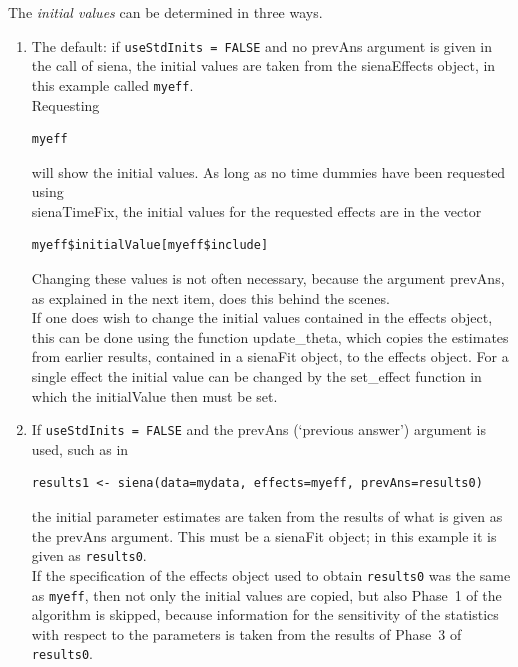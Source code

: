 \documentclass[a4paper,fleqn,11pt]{article}
\newcommand{\+}{\, + \,}
\newcommand{\sfn}[1]{\textsf{#1}}
\begin{document}
The \emph{initial values} can be determined in three ways.
\begin{enumerate}
\item The default: if \texttt{useStdInits = FALSE} and no \textsf{prevAns}
       argument is given in the call of \textsf{siena},
      the initial values are taken from the \textsf{sienaEffects} object,
      in this example called \texttt{myeff}.\\
      Requesting
\begin{verbatim}
myeff
\end{verbatim}
      will show the initial values.
      As long as no time dummies have been requested using\\
       \sfn{sienaTimeFix}, the initial values for the requested
      effects are in the vector
\begin{verbatim}
myeff$initialValue[myeff$include]
\end{verbatim}
      Changing these values is not often necessary, because the
      argument \textsf{prevAns}, as explained in the next item,
      does this behind the scenes.\\
       If one does wish to change the initial values contained in
      the effects object, this can be done using the
      function \textsf{update\_theta}, which copies the
      estimates from earlier results, contained in a
      \sfn{sienaFit} object, to the effects object.
      For a single effect the initial value can be changed
      by the \textsf{set\_effect}
      function in which the \textsf{initialValue} then must be set.
\item If \texttt{useStdInits = FALSE} and the \textsf{prevAns}
      (`previous answer')
      argument is used, such as in
      \begin{verbatim}
results1 <- siena(data=mydata, effects=myeff, prevAns=results0)
      \end{verbatim}
      the initial parameter estimates are taken from the results of
      what is given as the
      \textsf{prevAns} argument. This must be a
      \textsf{sienaFit} object; in this example it is given as
      \texttt{results0}.\\
      If the specification of the effects object used to obtain
      \texttt{results0} was the same as \texttt{myeff}, then not only the initial
      values are copied, but also Phase~1 of the algorithm is skipped,
      because information for the sensitivity of the statistics with
      respect to the parameters is taken from the results of Phase~3
      of \texttt{results0}.\\

\end{enumerate}
\end{document}

